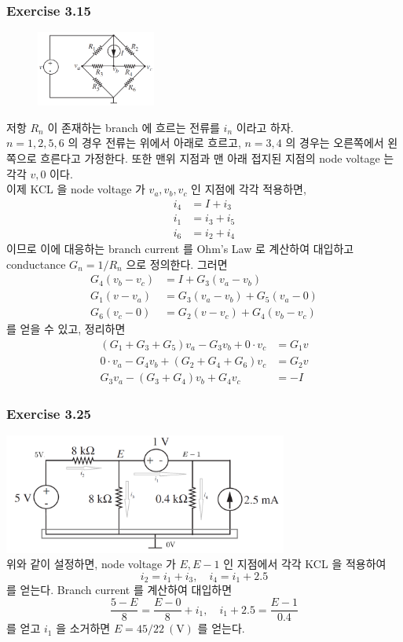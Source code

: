 \documentclass[13pt]{article}
\begin{document}
\subsubsection*{Exercise 3.15}
\begin{figure}
	\centering
	\includegraphics[width=0.35\textwidth]{ex3_15}
\end{figure}
저항 $R_n$ 이 존재하는 branch 에 흐르는 전류를 $i_n$ 이라고 하자.\\ $n = 1, 2, 5, 6$ 의 경우 전류는 위에서 아래로 흐르고, $n = 3, 4$ 의 경우는 오른쪽에서 왼쪽으로 흐른다고 가정한다. 또한 맨위 지점과 맨 아래 접지된 지점의 node voltage 는 각각 $v, 0$ 이다. \\ 이제 KCL 을 node voltage 가 $v_a, v_b, v_c$ 인 지점에 각각 적용하면,
\begin{align*}
i_4&=I+i_3 \\ i_1&=i_3+i_5 \\ i_6 &= i_2+i_4
\end{align*}
이므로 이에 대응하는 branch current 를 Ohm's Law 로 계산하여 대입하고 conductance $G_n = 1/R_n$ 으로 정의한다. 그러면
\begin{align*}
G_4(v_b-v_c) &= I + G_3(v_a-v_b) \\ 
G_1(v-v_a) &= G_3(v_a-v_b) + G_5(v_a - 0) \\ 
G_6(v_c - 0) &= G_2(v - v_c) + G_4(v_b-v_c)
\end{align*}
를 얻을 수 있고, 정리하면
\begin{align*}
(G_1+G_3+G_5)v_a - G_3v_b + 0\cdot v_c &= G_1v \\
0\cdot v_a - G_4v_b + (G_2+G_4+G_6)v_c &= G_2v\\
G_3v_a - (G_3+G_4)v_b + G_4v_c &= -I
\end{align*}

\pagebreak

\subsubsection*{Exercise 3.25}
\includegraphics[width=0.7\textwidth, center]{ex3_25}\\
위와 같이 설정하면, node voltage 가 $E, E-1$ 인 지점에서 각각 KCL 을 적용하여 $$i_2 = i_1+i_3, \quad i_4 = i_1 + 2.5$$ 를 얻는다. Branch current 를 계산하여 대입하면
$$\frac{5-E}{8} = \frac{E - 0}{8} + i_1, \quad i_1+2.5 = \frac{E-1}{0.4}$$ 를 얻고 $i_1$ 을 소거하면 $\boxed{E=45/22\:(\text{V})}$ 를 얻는다.
\end{document}
